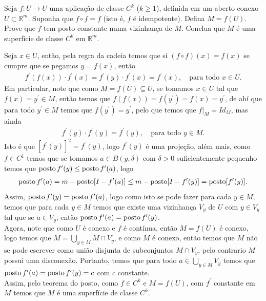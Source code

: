 \begin{homeworkProblem}
  Seja $f : U \to U$ uma aplicação de classe $C^k$ ($k \geq 1$), definida em um aberto conexo $U \subset \mathbb{R}^m$. Suponha que $f \circ f = f$ (isto é, $f$ é idempotente). Defina $M = f(U)$. Prove que $f$ tem posto constante numa vizinhança de $M$. Conclua que $M$ é uma superfície de classe $C^k$ em $\mathbb{R}^m$.
  \begin{solution}
    Seja $x\in U$, então, pela regra da cadeia temos que si $(f\circ f)(x)=f(x)$ se cumpre que se pegamos $y=f(x)$, então
    \begin{align*}
      f^{\prime}(f(x))\cdot f^{\prime}(x)=f^{\prime}(y)\cdot f^{\prime}(x)=f^{\prime}(x),\quad\text{para todo }x\in U.
    \end{align*}
    Em particular, note que como $M=f(U)\subseteq U$, se tomamos $x\in U$ tal que $f(x)=y^{\prime}\in M$, então temos que $f(f(x))=f(y^{\prime})=f(x)=y^{\prime}$, de ahí que para todo $y^{\prime}\in M$ temos que $f(y^{\prime})=y^{\prime}$, pelo que temos que $f\big|_{M}=Id_{M}$, mas ainda
    \begin{align*}
      f^{\prime}(y)\cdot f^{\prime}(y)=f^{\prime}(y),\quad\text{para todo }y\in M.
    \end{align*}
    Isto é que $[f^{\prime}(y)]^{2}=f^{\prime}(y)$, logo $f^{\prime}(y)$ é uma projeção, além mais, como $f\in C^{1}$ temos que se tomamos $a\in B(y,\delta)$ com $\delta>0$ suficientemente pequenho temos que $\operatorname{posto} f^{\prime}(y)\leq \operatorname{posto} f^{\prime}(a)$, logo
    \begin{align*}
      \operatorname{posto} f^{\prime}(a)= m-\operatorname{posto} [I-f^{\prime}(a)]\leq m-\operatorname{posto}[I-f^{\prime}(y)]=\operatorname{posto}[f^{\prime}(y)].
    \end{align*}
    Assim, $\operatorname{posto} f^{\prime}(y)=\operatorname{posto} f^{\prime}(a)$, logo como isto se pode fazer para cada $y\in M$, temos que para cada $y\in M$ temos que existe uma vizinhança $V_y$ de $U$ com $y\in V_y$ tal que se $a\in V_y$, então $\operatorname{posto} f^{\prime}(a)=\operatorname{posto} f^{\prime}(y)$.\\
    Agora, note que como $U$ é conexo e $f$ é contínua, então $M=f(U)$ é conexo, logo temos que $M=\bigcup_{y\in M} M\cap V_y$, e como $M$ é conexo, então temos que $M$ não se pode escrever como união disjunta de subconjuntos $M\cap V_y$, pelo contrario $M$ possui uma disconexão. Portanto, temos que para todo $a\in \bigcup_{y\in M}V_{y}$ temos que $\operatorname{posto} f^{\prime}(a)=\operatorname{posto} f^{\prime}(y)=c$ com $c$ constante.\\
    Assim, pelo teorema do posto, como $f\in C^{k}$ e $M=f(U)$, com $f^{\prime}$ constante em $M$ temos que $M$ é uma superfície de classe $C^{k}$. 
  \end{solution}
\end{homeworkProblem}
